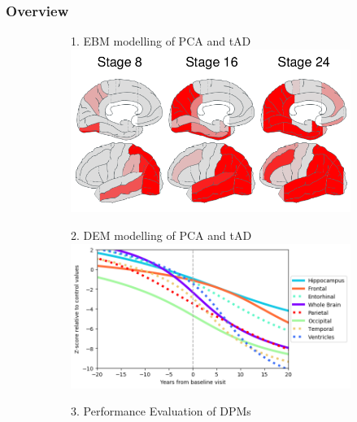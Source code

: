 \documentclass[10pt,xcolor=table]{beamer}
\begin{document}
\begin{frame}
\frametitle{Overview}

\vspace{-1em}
\begin{figure}
\centering
\begin{subfigure}{0.47\textwidth}
\centering
{
1. EBM modelling of PCA and tAD\\
\includegraphics[scale=0.15]{ebm_thumb.png}
}
\end{subfigure}
\begin{subfigure}{0.47\textwidth}
\centering
{
2. DEM  modelling of PCA and tAD\\
\includegraphics[scale=0.15]{../images/dem/mriSmallSebPaper_DEMStdPCA_trajAlign.png}
}
\end{subfigure}

\begin{subfigure}{0.47\textwidth}
\centering

3. Performance Evaluation of DPMs\\
\vspace{1em}

\end{subfigure}
\end{figure}
\end{frame}
\end{document}
